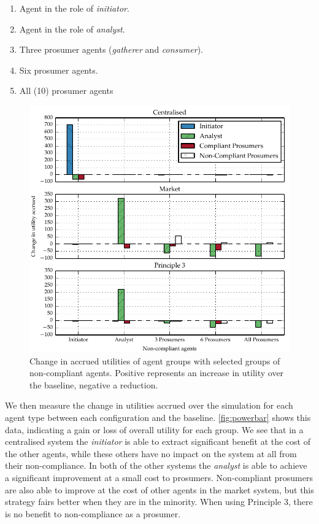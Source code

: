 \begin{enumerate}
\item Agent in the role of \emph{initiator}.
\item Agent in the role of \emph{analyst}.
\item Three prosumer agents (\emph{gatherer} and \emph{consumer}).
\item Six prosumer agents.
\item All (10) prosumer agents
\end{enumerate}

\begin{figure}
\includegraphics{gfx/kc/powerbar.pdf} 
\caption[Change in accrued utilities of agent groups with selected groups of non-compliant agents.]{Change in accrued utilities of agent groups with selected groups of non-compliant agents. Positive represents an increase in utility over the baseline, negative a reduction.}\label{fig:powerbar}
\end{figure}

We then measure the change in utilities accrued over the simulation for each
agent type between each configuration and the baseline. \autoref{fig:powerbar}
shows this data, indicating a gain or loss of overall utility for each group.
We see that in a centralised system the \emph{initiator} is able to extract
significant benefit at the cost of the other agents, while these others have
no impact on the system at all from their non-compliance. In both of the other
systems the \emph{analyst} is able to achieve a significant improvement at a
small cost to prosumers. Non-compliant prosumers are also able to improve at
the cost of other agents in the market system, but this strategy fairs better
when they are in the minority. When using Principle 3, there is no benefit to
non-compliance as a prosumer.

